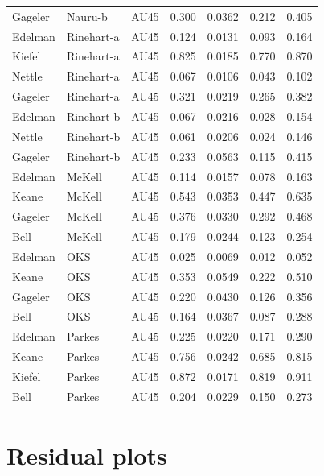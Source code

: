 \documentclass{monashthesis}
\begin{document}
\begin{center}
\begin{longtable}{lllllll}
Gageler & Nauru-b & AU45 & 0.300 & 0.0362 & 0.212 & 0.405 \\
Edelman & Rinehart-a & AU45 & 0.124 & 0.0131 & 0.093 & 0.164 \\
Kiefel & Rinehart-a & AU45 & 0.825 & 0.0185 & 0.770 & 0.870 \\
Nettle & Rinehart-a & AU45 & 0.067 & 0.0106 & 0.043 & 0.102 \\
Gageler & Rinehart-a & AU45 & 0.321 & 0.0219 & 0.265 & 0.382 \\
Edelman & Rinehart-b & AU45 & 0.067 & 0.0216 & 0.028 & 0.154 \\
Nettle & Rinehart-b & AU45 & 0.061 & 0.0206 & 0.024 & 0.146 \\
Gageler & Rinehart-b & AU45 & 0.233 & 0.0563 & 0.115 & 0.415 \\
Edelman & McKell & AU45 & 0.114 & 0.0157 & 0.078 & 0.163 \\
Keane & McKell & AU45 & 0.543 & 0.0353 & 0.447 & 0.635 \\
Gageler & McKell & AU45 & 0.376 & 0.0330 & 0.292 & 0.468 \\
Bell & McKell & AU45 & 0.179 & 0.0244 & 0.123 & 0.254 \\
Edelman & OKS & AU45 & 0.025 & 0.0069 & 0.012 & 0.052 \\
Keane & OKS & AU45 & 0.353 & 0.0549 & 0.222 & 0.510 \\
Gageler & OKS & AU45 & 0.220 & 0.0430 & 0.126 & 0.356 \\
Bell & OKS & AU45 & 0.164 & 0.0367 & 0.087 & 0.288 \\
Edelman & Parkes & AU45 & 0.225 & 0.0220 & 0.171 & 0.290 \\
Keane & Parkes & AU45 & 0.756 & 0.0242 & 0.685 & 0.815 \\
Kiefel & Parkes & AU45 & 0.872 & 0.0171 & 0.819 & 0.911 \\
Bell & Parkes & AU45 & 0.204 & 0.0229 & 0.150 & 0.273 \\
\end{longtable}
\end{center}

\hypertarget{residual-plots}{%
\section{Residual plots}\label{residual-plots}}
\end{document}
